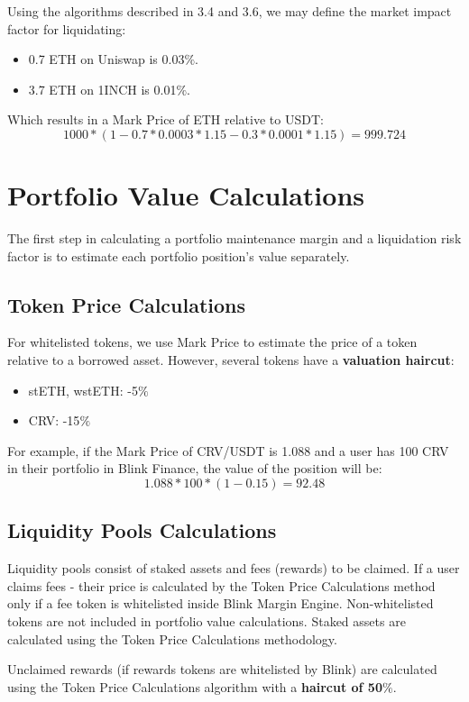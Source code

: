 \documentclass[conference]{IEEEtran}
\begin{document}
Using the algorithms described in 3.4 and 3.6, we may define the market impact factor for liquidating:
\begin{itemize}
	\item 0.7 ETH on Uniswap is 0.03$\%$.
	\item 3.7 ETH on 1INCH is 0.01$\%$.
\end{itemize}

Which results in a Mark Price of ETH relative to USDT:
$$1000*(1-0.7*0.0003*1.15-0.3*0.0001*1.15)=999.724$$

\section{Portfolio Value Calculations}

The first step in calculating a portfolio maintenance margin and a liquidation risk factor is to estimate each portfolio position's value separately.

\subsection{Token Price Calculations}

For whitelisted tokens, we use Mark Price to estimate the price of a token relative to a borrowed asset. However, several tokens have a \textbf{valuation haircut}:

\begin{itemize}
	\item stETH, wstETH: -5$\%$
	\item CRV: -15$\%$
\end{itemize}


For example, if the Mark Price of CRV/USDT is 1.088 and a user has 100 CRV in their portfolio in Blink Finance, the value of the position will be:
$$1.088 * 100 * (1-0.15)= 92.48$$


\subsection{Liquidity Pools Calculations}
Liquidity pools consist of staked assets and fees (rewards) to be claimed. If a user claims fees - their price is calculated by the Token Price Calculations method only if a fee token is whitelisted inside Blink Margin Engine. Non-whitelisted tokens are not included in portfolio value calculations.
Staked assets are calculated using the Token Price Calculations methodology. 

Unclaimed rewards (if rewards tokens are whitelisted by Blink) are calculated using the Token Price Calculations algorithm with a \textbf{haircut of 50$\%$}.
\end{document}
